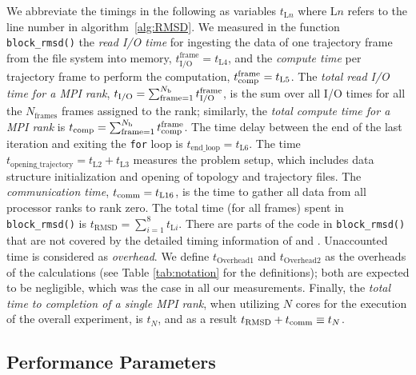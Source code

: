 We abbreviate the timings in the following as variables $t_{\text{L$n$}}$ where $\text{L$n$}$ refers to the line number in algorithm~\ref{alg:RMSD}.
We measured in the function \texttt{block\_rmsd()} the \emph{read I/O time} for ingesting the data of one trajectory frame from the file system into memory, $t_{\text{I/O}}^{\text{frame}} = t_{\text{L4}}$, and the \emph{compute time} per trajectory frame to perform the computation, ${t}_{\text{comp}}^{\text{frame}} = t_{\text{L5}}$.
The \emph{total read I/O time for a MPI rank},  ${t}_{\text{I/O}} = \sum_{\text{frame}=1}^{N_{\text{b}}} {t}_{\text{I/O}}^{\text{frame}}$, is the sum over all I/O times for all the $N_{\text{frames}}$ frames assigned to the rank; similarly, the \emph{total compute time for a MPI rank} is ${t}_{\text{comp}} = \sum_{\text{frame}=1}^{N_{\text{b}}} {t}_{\text{comp}}^{\text{frame}}$. 
The time delay between the end of the last iteration and exiting the \texttt{for} loop is $t_{\text{end\_loop}} = t_{\text{L6}}$.
The time $t_{\text{opening\_trajectory}} = t_{\text{L2}}+t_{\text{L3}}$ measures the problem setup, which includes data structure initialization and opening of topology and trajectory files.
The \emph{communication time}, $t_{\text{comm}} = t_{\text{L16}}$, is the time to gather all data from all processor ranks to rank zero.
The total time (for all frames) spent in \texttt{block\_rmsd()} is $t_{\text{RMSD}} = \sum_{i=1}^{8}t_{\text{L$i$}}$. 
There are parts of the code in \texttt{block\_rmsd()} that are not covered by the detailed timing information of \tcomp and \tIO.
Unaccounted time is considered as \emph{overhead}.
We define $t_{\text{Overhead1}}$ and $t_{\text{Overhead2}}$ as the overheads of the calculations (see Table \ref{tab:notation} for the definitions); both are expected to be negligible, which was the case in all our measurements. 
Finally, the \emph{total time to completion of a single MPI rank}, when utilizing $N$ cores for the execution of the overall experiment, is $t_{N}$, and as a result $t_{\text{RMSD}} + t_{\text{comm}} \equiv t_{N}$.

\subsection{Performance Parameters}


